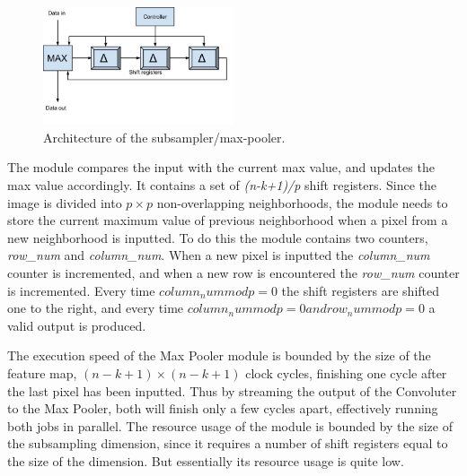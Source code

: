 \begin{figure}[h!]
  \centering
      \includegraphics[width=0.5\textwidth]{Figures/Method/submax}
  \caption{Architecture of the subsampler/max-pooler.}
\end{figure}

The module compares the input with the current max value, and updates the max value accordingly. It contains a set of \textit{(n-k+1)/p} shift registers. Since the image is divided into $ p \times p $ non-overlapping neighborhoods, the module needs to store the current maximum value of previous neighborhood when a pixel from a new neighborhood is inputted. To do this the module contains two counters, \textit{row\_num} and \textit{column\_num}. When a new pixel is inputted the \textit{column\_num} counter is incremented, and when a new row is encountered the \textit{row\_num} counter is incremented. Every time $ column_num mod p = 0 $ the shift registers are shifted one to the right, and every time $ column_num mod p = 0 and row_num mod p = 0 $ a valid output is produced. 



The execution speed of the Max Pooler module is bounded by the size of the feature map, $ (n-k+1) \times (n-k+1) $ clock cycles, finishing one cycle after the last pixel has been inputted. 
Thus by streaming the output of the Convoluter to the Max Pooler, both will finish only a few cycles apart, effectively running both jobs in parallel. The resource usage of the module is bounded by the size of the subsampling dimension, since it requires a number of shift registers equal to the size of the dimension. But essentially its resource usage is quite low.  

